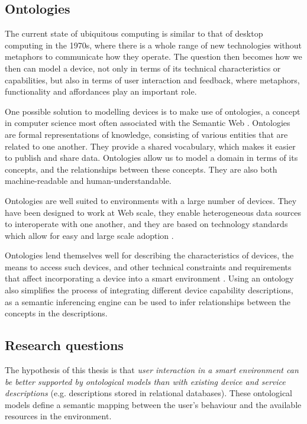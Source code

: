 \subsection{Ontologies}

The current state of ubiquitous computing is similar to that of desktop computing in the 1970s, where there is a whole range of new technologies without metaphors to communicate how they operate. The question then becomes how we then can model a device, not only in terms of its technical characteristics or capabilities, but also in terms of user interaction and feedback, where metaphors, functionality and affordances play an important role.

One possible solution to modelling devices is to make use of ontologies, a concept in computer science most often associated with the Semantic Web \cite{Berners-Lee2001}. Ontologies are formal representations of knowledge, consisting of various entities that are related to one another. They provide a shared vocabulary, which makes it easier to publish and share data. Ontologies allow us to model a domain in terms of its concepts, and the relationships between these concepts. They are also both machine-readable and human-understandable.

Ontologies are well suited to environments with a large number of devices. They have been designed to work at Web scale, they enable heterogeneous data sources to interoperate with one another, and they are based on technology standards which allow for easy and large scale adoption \cite{Sabou2010}.
 
Ontologies lend themselves well for describing the characteristics of devices, the means to access such devices, and other technical constraints and requirements that affect incorporating a device into a smart environment \cite{Owl2004}. Using an ontology also simplifies the process of integrating different device capability descriptions, as a semantic inferencing engine can be used to infer relationships between the concepts in the descriptions.


\subsection{Research questions}
\label{ResearchQuestions}
The hypothesis of this thesis is that \emph{user interaction in a smart environment can be better supported by ontological models than with existing device and service descriptions} (e.g. descriptions stored in relational databases). These ontological models define a semantic mapping between the user's behaviour and the available resources in the environment.


